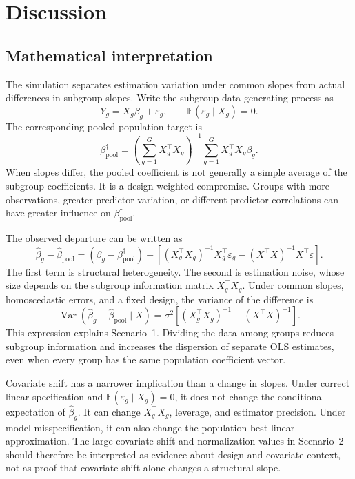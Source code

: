 \section{Discussion}\label{sec:discussion}

\subsection{Mathematical interpretation}

The simulation separates estimation variation under common slopes from actual differences in subgroup slopes. Write the subgroup data-generating process as
\[
Y_g = X_g\beta_g + \varepsilon_g, \qquad \mathbb{E}(\varepsilon_g \mid X_g) = 0.
\]
The corresponding pooled population target is
\[
\beta_{\mathrm{pool}}^{\dagger}
= \left(\sum_{g=1}^{G} X_g^{\top}X_g\right)^{-1}
	\sum_{g=1}^{G} X_g^{\top}X_g\beta_g.
\]
When slopes differ, the pooled coefficient is not generally a simple average of the subgroup coefficients. It is a design-weighted compromise. Groups with more observations, greater predictor variation, or different predictor correlations can have greater influence on $\beta_{\mathrm{pool}}^{\dagger}$.

The observed departure can be written as
\[
\hat{\beta}_g - \hat{\beta}_{\mathrm{pool}}
= \left(\beta_g - \beta_{\mathrm{pool}}^{\dagger}\right)
 + \left[(X_g^{\top}X_g)^{-1}X_g^{\top}\varepsilon_g
 - (X^{\top}X)^{-1}X^{\top}\varepsilon\right].
\]
The first term is structural heterogeneity. The second is estimation noise, whose size depends on the subgroup information matrix $X_g^{\top}X_g$. Under common slopes, homoscedastic errors, and a fixed design, the variance of the difference is
\[
\operatorname{Var}\!\left(\hat{\beta}_g - \hat{\beta}_{\mathrm{pool}} \mid X\right)
= \sigma^2\left[(X_g^{\top}X_g)^{-1} - (X^{\top}X)^{-1}\right].
\]
This expression explains Scenario~1. Dividing the data among groups reduces subgroup information and increases the dispersion of separate OLS estimates, even when every group has the same population coefficient vector.

Covariate shift has a narrower implication than a change in slopes. Under correct linear specification and $\mathbb{E}(\varepsilon_g\mid X_g)=0$, it does not change the conditional expectation of $\hat{\beta}_g$. It can change $X_g^{\top}X_g$, leverage, and estimator precision. Under model misspecification, it can also change the population best linear approximation. The large covariate-shift and normalization values in Scenario~2 should therefore be interpreted as evidence about design and covariate context, not as proof that covariate shift alone changes a structural slope.

